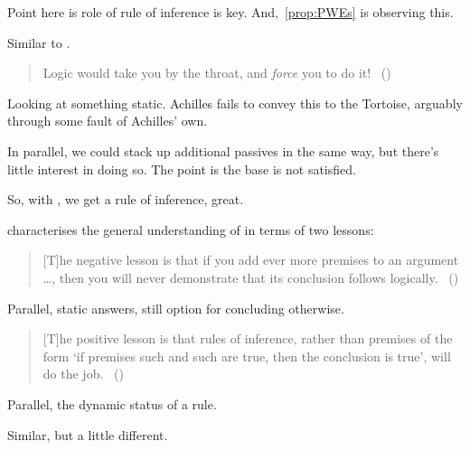 \begin{note}
  \color{red}
  Point here is role of rule of inference is key.
  And,~\autoref{prop:PWEs} is observing this.
\end{note}

\begin{note}
  Similar to \citeauthor{Carroll:1895uj}.
  \begin{quote}
    Logic would take you by the throat, and \emph{force} you to do it!%
    \mbox{ }\hfill\mbox{(\citeyear[280]{Carroll:1895uj})}
  \end{quote}
  Looking at something static.
  Achilles fails to convey this to the Tortoise, arguably through some fault of Achilles' own.

  In parallel, we could stack up additional passives in the same way, but there's little interest in doing so.
  The point is the base \requ{} is not satisfied.
\end{note}

\begin{note}
  So, with \citeauthor{Carroll:1895uj}, we get a rule of inference, great.

  \citeauthor{Wieland:2013vf} characterises the general understanding of \textcite{Carroll:1895uj} in terms of two lessons:
  \begin{quote}
    [T]he negative lesson is that if you add ever more premises to an argument \dots, then you will never demonstrate that its conclusion follows logically.%
    \mbox{ }\hfill\mbox{(\citeyear[984]{Wieland:2013vf})}
  \end{quote}

  Parallel, static answers, still option for concluding otherwise.

  \begin{quote}
    [T]he positive lesson is that rules of inference, rather than premises of the form `if premises such and such are true, then the conclusion is true', will do the job.%
    \mbox{ }\hfill\mbox{(\citeyear[984]{Wieland:2013vf})}
  \end{quote}

  Parallel, the dynamic status of a rule.
\end{note}

\begin{note}
  Similar, but a little different.
\end{note}

